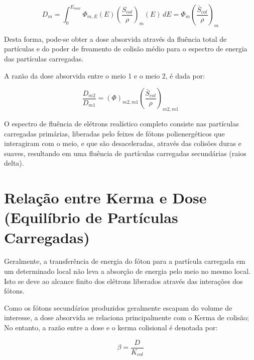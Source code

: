 \documentclass[11pt,a4paper]{article}
\begin{document}
			\begin{equation}
				D_{m}= \int_{0}^{E_{max}} \Phi_{m, E}(E)\left(\frac{S_{col}}{\rho}\right)_{m}(E)  \,dE
				= \Phi_m \left(\frac{\bar{S}_{col}}{\rho}\right)_m
				\label{eq:doseAbsorvidaNoMeio}
			\end{equation}

		Desta forma, pode-se obter a dose absorvida através da fluência total de partículas e do poder de freamento de colisão médio para o espectro de energia das partículas carregadas. 

		A razão da dose absorvida entre o meio 1 e o meio 2, é dada por:

			\begin{equation}
				\frac{D_{m2}}{D_{m1}} = (\Phi)_{m2,m1} \left(\frac{\bar{S}_{col}}{\rho}\right)_{m2,m1}
			\end{equation}


		O espectro de fluência de elétrons realístico completo consiste nas partículas carregadas primárias, liberadas pelo feixes de fótons polienergéticos que interagiram com o meio, e que são desaceleradas, através das colisões duras e suaves, resultando em uma fluência de partículas carregadas secundárias (raios delta). 
		
		

	\section{Relação entre Kerma e Dose (Equilíbrio de Partículas Carregadas)}
		

		Geralmente, a transferência de energia do fóton para a partícula carregada em um determinado local não leva a absorção de energia pelo meio no mesmo local. Isto se deve ao alcance finito dos elétrons liberados através das interações dos fótons.

		Como os fótons secundários produzidos geralmente escapam do volume de interesse, a dose absorvida se relaciona principalmente com o Kerma de colisão; No entanto, a razão entre a dose e o kerma colisional é denotada por:

		\begin{equation}
			\beta = \frac{D}{K_{col}}
		\end{equation}
\end{document}
